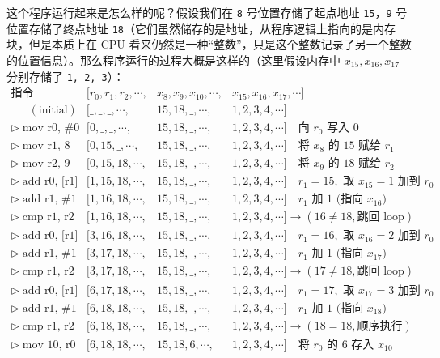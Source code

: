 这个程序运行起来是怎么样的呢？假设我们在 \texttt{8} 号位置存储了起点地址 \texttt{15}，\texttt{9} 号位置存储了终点地址 \texttt{18}（它们虽然储存的是地址，从程序逻辑上指向的是内存块，但是本质上在 CPU 看来仍然是一种“整数”，只是这个整数记录了另一个整数的位置信息）。那么程序运行的过程大概是这样的（这里假设内存中 $x_{15}, x_{16}, x_{17}$ 分别存储了 \texttt{1, 2, 3}）：
\[
    \begin{array}{l|lll}
        \text{指令} & [r_0, r_1, r_2, \cdots, & x_8, x_9, x_{10}, \cdots, & x_{15}, x_{16}, x_{17}, \cdots]\\
        \hline
        \phantom{\triangleright} \; (\text{initial}) & [\_, \_, \_, \cdots, & 15, 18, \_, \cdots, & 1, 2, 3, 4, \cdots] \\
        \triangleright \; \text{mov r0, \#0} & [0, \_, \_, \cdots, & 15, 18, \_, \cdots, & 1, 2, 3, 4, \cdots] \quad \text{向 $r_0$ 写入 0}\\
        \triangleright \; \text{mov r1, 8} & [0, 15, \_, \cdots, & 15, 18, \_, \cdots, & 1, 2, 3, 4, \cdots] \quad \text{将 $x_8$ 的 15 赋给 $r_1$}\\
        \triangleright \; \text{mov r2, 9} & [0, 15, 18, \cdots, & 15, 18, \_, \cdots, & 1, 2, 3, 4, \cdots] \quad \text{将 $x_9$ 的 18 赋给 $r_2$}\\
        \triangleright \; \text{add r0, [r1]} & [1, 15, 18, \cdots, & 15, 18, \_, \cdots, & 1, 2, 3, 4, \cdots] \quad \text{$r_1 = 15,$ 取 $x_{15}=1$ 加到 $r_0$}\\
        \triangleright \; \text{add r1, \#1} & [1, 16, 18, \cdots, & 15, 18, \_, \cdots, & 1, 2, 3, 4, \cdots] \quad \text{$r_1$ 加 1 (指向 $x_{16}$)}\\
        \triangleright \; \text{cmp r1, r2} & [1, 16, 18, \cdots, & 15, 18, \_, \cdots, & 1, 2, 3, 4, \cdots] \to (16 \neq 18, \text{跳回 loop}) \\
        \triangleright \; \text{add r0, [r1]} & [3, 16, 18, \cdots, & 15, 18, \_, \cdots, & 1, 2, 3, 4, \cdots] \quad \text{$r_1 = 16,$ 取 $x_{16}=2$ 加到 $r_0$}\\
        \triangleright \; \text{add r1, \#1} & [3, 17, 18, \cdots, & 15, 18, \_, \cdots, & 1, 2, 3, 4, \cdots] \quad \text{$r_1$ 加 1 (指向 $x_{17}$)}\\
        \triangleright \; \text{cmp r1, r2} & [3, 17, 18, \cdots, & 15, 18, \_, \cdots, & 1, 2, 3, 4, \cdots] \to (17 \neq 18, \text{跳回 loop}) \\
        \triangleright \; \text{add r0, [r1]} & [6, 17, 18, \cdots, & 15, 18, \_, \cdots, & 1, 2, 3, 4, \cdots] \quad \text{$r_1 = 17,$ 取 $x_{17}=3$ 加到 $r_0$}\\
        \triangleright \; \text{add r1, \#1} & [6, 18, 18, \cdots, & 15, 18, \_, \cdots, & 1, 2, 3, 4, \cdots] \quad \text{$r_1$ 加 1 (指向 $x_{18}$)}\\
        \triangleright \; \text{cmp r1, r2} & [6, 18, 18, \cdots, & 15, 18, \_, \cdots, & 1, 2, 3, 4, \cdots] \to (18 = 18, \text{顺序执行}) \\
        \triangleright \; \text{mov 10, r0} & [6, 18, 18, \cdots, & 15, 18, 6, \cdots, & 1, 2, 3, 4, \cdots] \quad \text{将 $r_0$ 的 6 存入 $x_{10}$}
    \end{array}
\]

